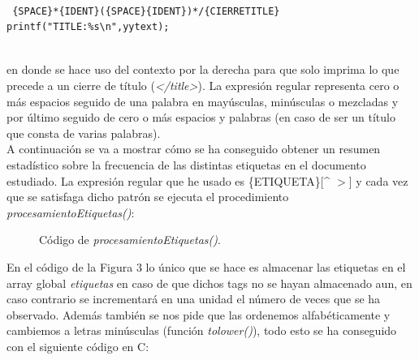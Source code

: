 \documentclass[10pt, a4paper,spanish]{article}
\begin{document}
 \begin{lstlisting}
 
 {SPACE}*{IDENT}({SPACE}{IDENT})*/{CIERRETITLE} printf("TITLE:%s\n",yytext);

\end{lstlisting}

\noindent \\ en donde se hace uso del contexto por la derecha para que solo  imprima lo que precede a un cierre de título (\textit{</title>}). La expresión regular representa cero o más espacios seguido de una palabra en mayúsculas, minúsculas o mezcladas y por último seguido de cero o más espacios y palabras (en caso de ser un título que consta de varias palabras). \\

\noindent A continuación se va a mostrar cómo se ha conseguido obtener un resumen estadístico sobre la frecuencia de las distintas etiquetas en el documento estudiado. La expresión regular que he usado es \{ETIQUETA\}[\^{} $>$] y cada vez que se satisfaga dicho patrón se ejecuta el procedimiento \textit{procesamientoEtiquetas()}:

\begin{figure}[H]
  \centering
  \caption{Código de \textit{procesamientoEtiquetas()}.}
\end{figure}

\noindent En el código de la Figura 3 lo único que se hace es almacenar las etiquetas en el array global \textit{etiquetas} en caso de que dichos tags no se hayan almacenado aun, en caso contrario se incrementará en una unidad el número de veces que se ha observado. Además también se nos pide que las ordenemos alfabéticamente y cambiemos a letras minúsculas (función \textit{tolower()}), todo esto se ha conseguido con el siguiente código en C:
\end{document}
